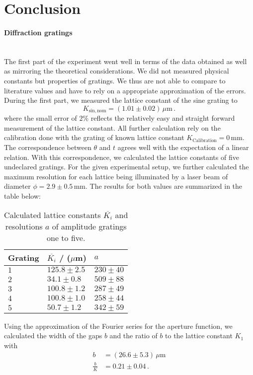 \FloatBarrier
\section{Conclusion}
\paragraph{Diffraction gratings}~\\
The first part of the experiment went well in terms of the data obtained as well 
as mirroring the theoretical considerations. We did not measured 
physical constants but properties of gratings. We thus are not able to compare to 
literature values and have to rely on a appropriate approximation of the errors.
During the first part, 
we measured the lattice constant of the sine grating to 
\begin{equation}
    K_\mathrm{sin, nom} =(1.01 \pm 0.02) \, \mu\mathrm{m} \,.
\end{equation}
where the small error of $2\%$ reflects the relatively easy 
and straight forward measurement of the lattice constant. 
All further calculation rely on the calibration done with the 
grating of known lattice constant $K_\mathrm{Calibration} = 0\,$mm.
The correspondence between $\theta$ and $t$ agrees well 
with the expectation of a linear relation. 
With this correspondence, we calculated the lattice constants of five 
undeclared gratings. For the given experimental setup, we further calculated 
the maximum resolution for each lattice being illuminated by a laser beam of 
diameter $\phi = 2.9 \pm 0.5\,$mm.
The results for both values are summarized in the table below:
\begin{table}[H]
    \centering
	\begin{tabular}{|p{3.82cm}|p{3.82cm}|p{3.82cm}|}
		\hline
		\rowcolor{tabcolor}
        Grating & $\overline{K_i}$ / ($\mu$m) & $a$ \\ \hline
        $1$  & $ 125.8 \pm 2.5  $ & $ 230 \pm 40 $ \\
		$2$  & $ 34.1 \pm 0.8   $ & $ 509 \pm 88 $ \\
		$3$  & $ 100.8 \pm 1.2  $ & $ 287 \pm 49 $ \\
		$4$  & $ 100.8 \pm 1.0  $ & $ 258 \pm 44 $ \\
		$5$  & $ 50.7 \pm 1.2   $ & $ 342 \pm 59 $ \\
		\hline
	\end{tabular}
    \caption{
        Calculated lattice constants $\overline{K_i}$ and 
        resolutions $a$ of amplitude gratings one to five. 
        }
    \label{tab:gratings_K_conc}
\end{table}
Using the approximation of the Fourier series for the aperture function, 
we calculated the width of the gaps $b$ and the ratio of $b$ to the 
lattice constant $K_1$ with
\begin{align}
    b &= (26.6 \pm 5.3)\, \mu\mathrm{m} \\
    \frac{b}{K} &= 0.21 \pm 0.04  \, .
\end{align}


